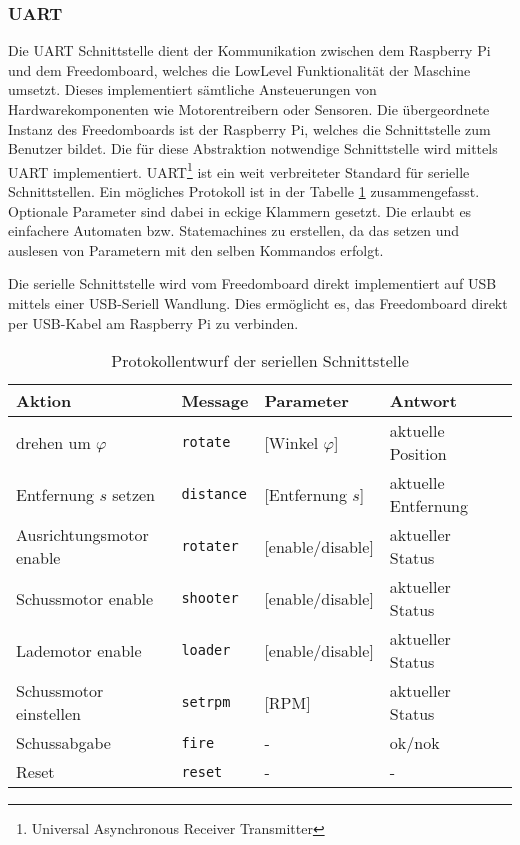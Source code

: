 \subsubsection{UART}
\label{subsub:uart}
Die UART Schnittstelle dient der Kommunikation zwischen dem Raspberry Pi und dem Freedomboard, welches die LowLevel Funktionalität der Maschine umsetzt. Dieses implementiert sämtliche Ansteuerungen von Hardwarekomponenten wie Motorentreibern oder Sensoren. Die übergeordnete Instanz des Freedomboards ist der Raspberry Pi, welches die Schnittstelle zum Benutzer bildet. 
Die für diese Abstraktion notwendige Schnittstelle wird mittels UART
implementiert. UART\footnote{Universal Asynchronous Receiver Transmitter}
ist ein weit verbreiteter Standard für serielle Schnittstellen. Ein mögliches
Protokoll ist in der Tabelle \ref{tab:uart}
zusammengefasst. Optionale Parameter sind dabei in eckige Klammern gesetzt.
Die erlaubt es einfachere Automaten bzw. Statemachines zu erstellen, da das
setzen und auslesen von Parametern mit den selben Kommandos erfolgt.

Die serielle Schnittstelle wird vom Freedomboard direkt implementiert auf
USB mittels einer USB-Seriell Wandlung. Dies ermöglicht es, das Freedomboard
direkt per USB-Kabel am Raspberry Pi zu verbinden.

\begin{table}[h!]
	\centering
	\begin{tabular}{l l l l l}
		Aktion & Message & Parameter & Antwort \\
		\hline
		drehen um $\varphi$ 
			& \verb!rotate!
			& [Winkel $\varphi$]
			& aktuelle Position \\
		Entfernung $s$ setzen
			& \verb!distance!
			& [Entfernung $s$]
			& aktuelle Entfernung \\
		Ausrichtungsmotor enable
			& \verb!rotater!
			& [enable/disable]
			& aktueller Status \\
		Schussmotor enable
			& \verb!shooter! 
			& [enable/disable]
			& aktueller Status \\
		Lademotor enable
			& \verb!loader!
			& [enable/disable]
			& aktueller Status \\
		Schussmotor einstellen
			& \verb!setrpm!
			& [RPM]
			& aktueller Status \\
		Schussabgabe
			& \verb!fire!
			& -
			& ok/nok \\
		Reset
			& \verb!reset!
			& -
			& -\\
	\end{tabular}
	\caption{Protokollentwurf der seriellen Schnittstelle}
	\label{tab:uart}
\end{table}

